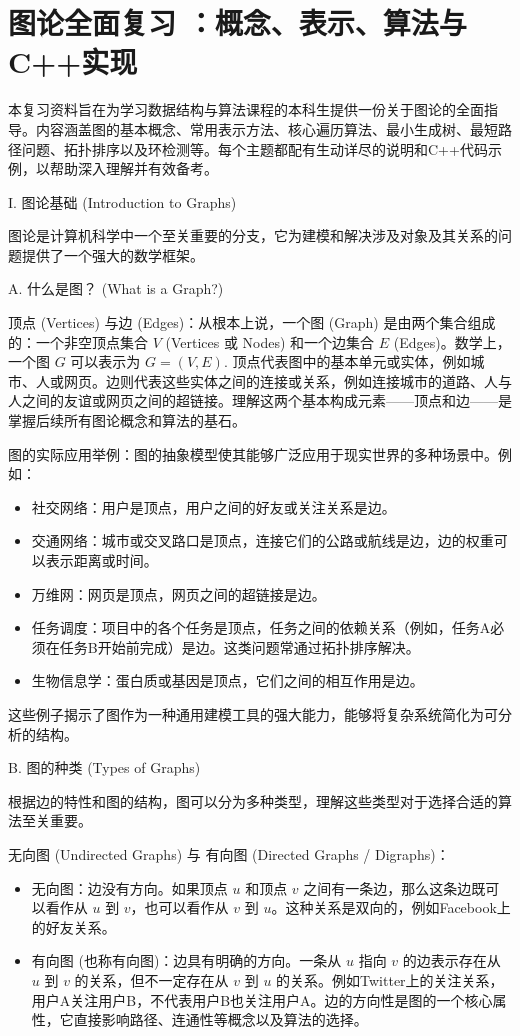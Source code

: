 \section{图论全面复习 ：概念、表示、算法与C++实现}

本复习资料旨在为学习数据结构与算法课程的本科生提供一份关于图论的全面指导。内容涵盖图的基本概念、常用表示方法、核心遍历算法、最小生成树、最短路径问题、拓扑排序以及环检测等。每个主题都配有生动详尽的说明和C++代码示例，以帮助深入理解并有效备考。

I. 图论基础 (Introduction to Graphs)

图论是计算机科学中一个至关重要的分支，它为建模和解决涉及对象及其关系的问题提供了一个强大的数学框架。

A. 什么是图？ (What is a Graph?)

顶点 (Vertices) 与边 (Edges)：从根本上说，一个图 (Graph) 是由两个集合组成的：一个非空顶点集合 $V$ (Vertices 或 Nodes) 和一个边集合 $E$ (Edges)。数学上，一个图 $G$ 可以表示为 $G=(V,E)$. 顶点代表图中的基本单元或实体，例如城市、人或网页。边则代表这些实体之间的连接或关系，例如连接城市的道路、人与人之间的友谊或网页之间的超链接。理解这两个基本构成元素——顶点和边——是掌握后续所有图论概念和算法的基石。

图的实际应用举例：图的抽象模型使其能够广泛应用于现实世界的多种场景中。例如：

\begin{itemize}
	\item 社交网络：用户是顶点，用户之间的好友或关注关系是边。
	\item 交通网络：城市或交叉路口是顶点，连接它们的公路或航线是边，边的权重可以表示距离或时间。
	\item 万维网：网页是顶点，网页之间的超链接是边。
	\item 任务调度：项目中的各个任务是顶点，任务之间的依赖关系（例如，任务A必须在任务B开始前完成）是边。这类问题常通过拓扑排序解决。
	\item 生物信息学：蛋白质或基因是顶点，它们之间的相互作用是边。
\end{itemize}

这些例子揭示了图作为一种通用建模工具的强大能力，能够将复杂系统简化为可分析的结构。

B. 图的种类 (Types of Graphs)

根据边的特性和图的结构，图可以分为多种类型，理解这些类型对于选择合适的算法至关重要。

无向图 (Undirected Graphs) 与 有向图 (Directed Graphs / Digraphs)：

\begin{itemize}
	\item 无向图：边没有方向。如果顶点 $u$ 和顶点 $v$ 之间有一条边，那么这条边既可以看作从 $u$ 到 $v$，也可以看作从 $v$ 到 $u$。这种关系是双向的，例如Facebook上的好友关系。
	\item 有向图 (也称有向图)：边具有明确的方向。一条从 $u$ 指向 $v$ 的边表示存在从 $u$ 到 $v$ 的关系，但不一定存在从 $v$ 到 $u$ 的关系。例如Twitter上的关注关系，用户A关注用户B，不代表用户B也关注用户A。边的方向性是图的一个核心属性，它直接影响路径、连通性等概念以及算法的选择。
\end{itemize}

